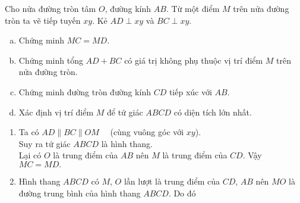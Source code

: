 \begin{vd}
Cho nửa đường tròn tâm $O$, đường kính $AB$. Từ một điểm $M$ trên nửa đường tròn ta vẽ tiếp tuyến $xy$. Kẻ $AD \perp xy$ và $BC \perp xy$.
\begin{enumerate}[a)]
\item Chứng minh $MC=MD$.
\item Chứng minh tổng $AD+BC$ có giá trị không phụ thuộc vị trí điểm $M$ trên nửa đường tròn.
\item Chứng minh đường tròn đường kính $CD$ tiếp xúc với $AB$.
\item Xác định vị trí điểm $M$ để tứ giác $ABCD$ có diện tích lớn nhất.
\end{enumerate}
\loigiai
{
\begin{center}
\end{center}
\begin{enumerate}
\item Ta có $AD \parallel BC \parallel OM \quad$ (cùng vuông góc với $xy$).\\
Suy ra tứ giác $ABCD$ là hình thang.\\
Lại có $O$ là trung điểm của $AB$ nên $M$ là trung điểm của $CD$. Vậy $MC=MD.$
\item Hình thang $ABCD$ có $M$, $O$ lần lượt là trung điểm của $CD$, $AB$ nên $MO$ là đường trung bình của hình thang $ABCD$. Do đó

\end{enumerate}}
\end{vd}
